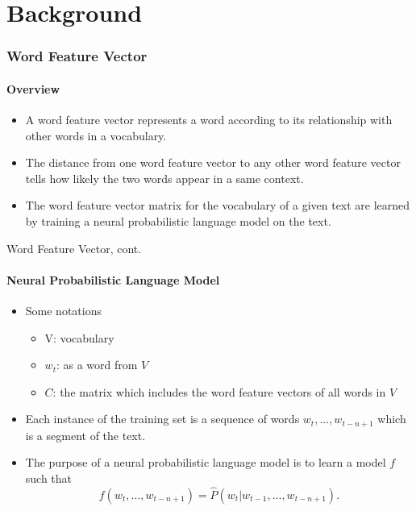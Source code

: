 \documentclass{beamer}
\begin{document}
\section{Background}

\begin{frame} \frametitle{Word Feature Vector}\framesubtitle{Overview}
  \begin{itemize}
      \item A word feature vector represents a word according to its relationship with other words in a vocabulary.
      \item The distance from one word feature vector to any other word feature vector tells how likely the two words appear in a same context.
      \item The word feature vector matrix for the vocabulary of a given text are learned by training a neural probabilistic language model on the text.
  \end{itemize}
\end{frame}

\begin{frame}{Word Feature Vector, cont.}\framesubtitle{Neural Probabilistic Language Model}

    \begin{itemize}
        \item Some notations
            \begin{itemize}
                \item V: vocabulary
                \item $w_t$: as a word from $V$
                \item $C$: the matrix which includes the word feature vectors of all words in $V$
            \end{itemize}
        \item Each instance of the training set is a sequence of words $w_t, ..., w_{t-n+1}$ which is a segment of the text.
        \item The purpose of a neural probabilistic language model is to learn a model $f$ such that
        $$ f(w_t, ..., w_{t-n+1}) = \hat{P}(w_t | w_{t-1},...,w_{t-n+1}).$$
    \end{itemize}
\end{frame}
\end{document}
